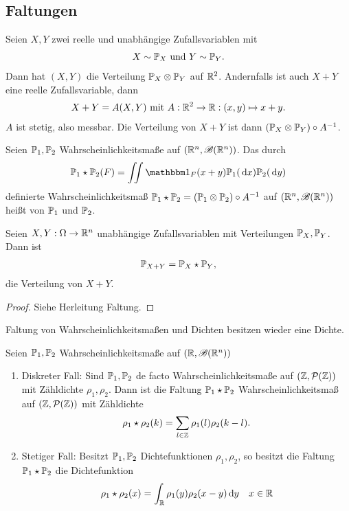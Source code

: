 \subsection*{Faltungen}
Seien $X, Y$ zwei reelle und unabhängige Zufallsvariablen mit 
\begin{align*}
	X \sim \P_X \und Y \sim \P_Y.
\end{align*}
Dann hat $(X,Y)$ die Verteilung $\P_X \otimes \P_Y$ auf $\R^2$. Andernfalls ist auch $X+Y$ eine reelle Zufallsvariable, dann
\begin{align*}
	X + Y = A(X,Y) \mit A: \R^2 \to \R: (x,y) \mapsto x + y.
\end{align*}
$A$ ist stetig, also messbar. Die Verteilung von $X+Y$ ist dann $(\P_X \otimes \P_Y)\circ A^{-1}$.
\begin{definition}[Faltung]
	Seien $\P_1 , \P_2$ Wahrscheinlichkeitsmaße auf $(\Rn, \borel(\Rn))$. Das durch
	\begin{align*}
		\P_1 \star \P_2(F) = \iint \indi_F (x+y) \P_1 (\d x)\P_2 (\d y)
	\end{align*}
	definierte Wahrscheinlichkeitsmaß $\P_1 \star \P_2 = (\P_1 \otimes \P_2) \circ A^{-1}$ auf $(\Rn, \borel(\Rn))$ heißt  von $\P_1$ und $\P_2$.
\end{definition}
\begin{proposition}
	Seien $X,Y: \O \to \Rn$ unabhängige Zufallsvariablen mit Verteilungen $\P_X, \P_Y$. Dann ist
	\begin{align*}
		\P_{X+Y} = \P_X \star \P_Y,
	\end{align*}
	die Verteilung von $X +  Y$.
\end{proposition}
\begin{proof}
	Siehe Herleitung Faltung.
\end{proof}
Faltung von Wahrscheinlichkeitsmaßen und Dichten besitzen wieder eine Dichte.
\begin{proposition}
	Seien $\P_1 , \P_2$ Wahrscheinlichkeitsmaße auf $(\R, \borel(\Rn))$
	\begin{enumerate}
		\item Diskreter Fall: Sind $\P_1 , \P_2$ de facto Wahrscheinlichkeitsmaße auf $(\Z, \pows(\Z))$ mit Zähldichte $\rho_1 , \rho_2$. Dann ist die Faltung $\P_1 \star \P_2$ Wahrscheinlichkeitsmaß auf $(\Z, \pows(\Z))$ mit Zähldichte
		\begin{align*}
			\rho_1 \star \rho_2 (k) = \sum_{l \in \Z} \rho_1 (l) \rho_2 (k-l).
		\end{align*}
		\item Stetiger Fall: Besitzt $\P_1 , \P_2$ Dichtefunktionen $\rho_1, \rho_2$, so besitzt die Faltung $\P_1 \star \P_2$ die Dichtefunktion
		\begin{align*}
			\rho_1 \star \rho_2 (x) = \int_{\R} \rho_1 (y) \rho_2 (x-y) \d y \quad x \in \R
		\end{align*}
	\end{enumerate}
\end{proposition}
